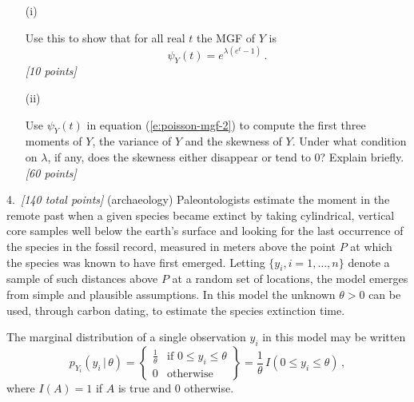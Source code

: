\documentclass[12pt]{article}
\newcommand{\given}{\, | \,}
\begin{document}
\begin{itemize}
\begin{itemize}

\item[(i)]%

Use this to show that for all real $t$ the MGF of $Y$ is
\begin{equation} \label{e:poisson-mgf-2}
\psi_Y ( t ) = e^{ \lambda \left( e^t - 1 \right) } \, .
\end{equation}
\textit{[10 points]}

\item[(ii)]%

Use $\psi_Y ( t )$ in equation (\ref{e:poisson-mgf-2}) to compute the first three moments of $Y$, the variance of $Y$ and the skewness of $Y$. Under what condition on $\lambda$, if any, does the skewness either disappear or tend to 0? Explain briefly. \textit{[60 points]}

\end{itemize}

\end{itemize}

4.~\textit{[140 total points]} (archaeology) Paleontologists estimate the moment in the remote past when a given species became extinct by taking cylindrical, vertical core samples well below the earth's surface and looking for the last occurrence of the species in the fossil record, measured in meters above the point $P$ at which the species was known to have first emerged. Letting $\{ y_i, i = 1, \ldots, n \}$ denote \vspace*{0.5ex} a sample of such distances above $P$ at a random set of locations, the model \vspace*{0.5ex} 
emerges from simple and plausible assumptions. In this model the unknown
$\theta > 0$ can be used, through carbon dating, to estimate the species
extinction time.

The marginal distribution of a single observation $y_i$ in this model may be written
\begin{equation} \label{uniform-1}
p_{ Y_i } ( y_i \given \theta ) = \left\{ \begin{array}{cc} \frac{ 1 }{ \theta } & \mbox{if } 0 \le y_i \le \theta \\ 0 & \mbox{otherwise} \end{array}
\right\} = \frac{ 1 }{ \theta } \, I \left( 0 \le y_i \le \theta \right) \, , 
\end{equation}
where $I ( A ) = 1$ if $A$ is true and 0 otherwise. 
\end{document}
